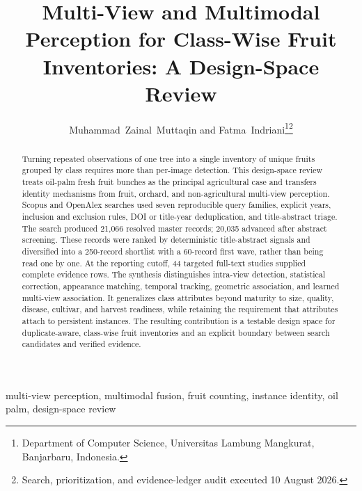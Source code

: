 \documentclass[journal]{IEEEtran}
\begin{document}
\title{Multi-View and Multimodal Perception for Class-Wise Fruit Inventories: A Design-Space Review}
\author{Muhammad~Zainal~Muttaqin and Fatma~Indriani\thanks{Department of Computer Science, Universitas Lambung Mangkurat, Banjarbaru, Indonesia.}\thanks{Search, prioritization, and evidence-ledger audit executed 10 August 2026.}}
\maketitle
\begin{abstract}
Turning repeated observations of one tree into a single inventory of unique fruits grouped by class requires more than per-image detection. This design-space review treats oil-palm fresh fruit bunches as the principal agricultural case and transfers identity mechanisms from fruit, orchard, and non-agricultural multi-view perception. Scopus and OpenAlex searches used seven reproducible query families, explicit years, inclusion and exclusion rules, DOI or title-year deduplication, and title-abstract triage. The search produced 21,066 resolved master records; 20,035 advanced after abstract screening. These records were ranked by deterministic title-abstract signals and diversified into a 250-record shortlist with a 60-record first wave, rather than being read one by one. At the reporting cutoff, 44 targeted full-text studies supplied complete evidence rows. The synthesis distinguishes intra-view detection, statistical correction, appearance matching, temporal tracking, geometric association, and learned multi-view association. It generalizes class attributes beyond maturity to size, quality, disease, cultivar, and harvest readiness, while retaining the requirement that attributes attach to persistent instances. The resulting contribution is a testable design space for duplicate-aware, class-wise fruit inventories and an explicit boundary between search candidates and verified evidence.
\end{abstract}
\begin{IEEEkeywords}
multi-view perception, multimodal fusion, fruit counting, instance identity, oil palm, design-space review
\end{IEEEkeywords}



\end{document}
